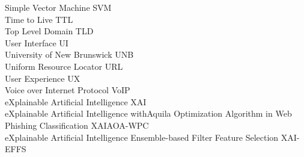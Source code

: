 Simple Vector Machine \hfill SVM\\
Time to Live \hfill TTL\\
Top Level Domain \hfill TLD\\
User Interface \hfill UI\\
University of New Brunswick \hfill UNB\\
Uniform Resource Locator \hfill URL\\
User Experience \hfill UX\\
Voice over Internet Protocol \hfill VoIP\\
eXplainable Artificial Intelligence \hfill XAI\\
eXplainable Artificial Intelligence with\newline Aquila Optimization Algorithm in Web Phishing Classification \hfill XAIAOA-WPC\\
eXplainable Artificial Intelligence Ensemble-based Filter Feature Selection \hfill XAI-EFFS\\
